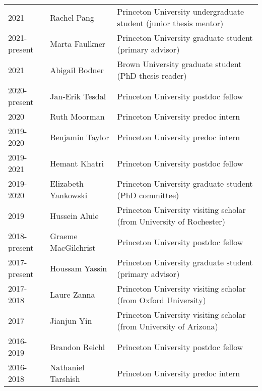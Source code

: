 \documentclass{article}
\begin{document}
\begin{tabular}{lll}

2021 & Rachel Pang& Princeton University undergraduate student (junior thesis mentor) \\ 

2021-present & Marta Faulkner& Princeton University graduate student (primary advisor) \\ 

2021 & Abigail Bodner& Brown University graduate student (PhD thesis reader) \\ 


2020-present & Jan-Erik Tesdal& Princeton University postdoc fellow \\ 
2020 & Ruth Moorman & Princeton University predoc intern \\ 

2019-2020 & Benjamin Taylor & Princeton University predoc intern \\ 

2019-2021 & Hemant Khatri & Princeton University postdoc fellow  \\ 

2019-2020 & Elizabeth Yankowski & Princeton University graduate student (PhD committee) \\ 

2019     & Hussein Aluie & Princeton University visiting scholar (from University of Rochester)  \\ 
2018-present & Graeme MacGilchrist & Princeton University postdoc fellow \\ 

2017-present & Houssam Yassin & Princeton University graduate student (primary advisor) \\ 

2017-2018 & Laure Zanna  & Princeton University visiting scholar (from Oxford University)  \\

2017 & Jianjun Yin       & Princeton University visiting scholar (from University of Arizona)  \\

2016-2019 & Brandon Reichl       & Princeton University postdoc fellow  \\

2016-2018 & Nathaniel Tarshish & Princeton University predoc intern \\


\end{tabular}
\end{document}
